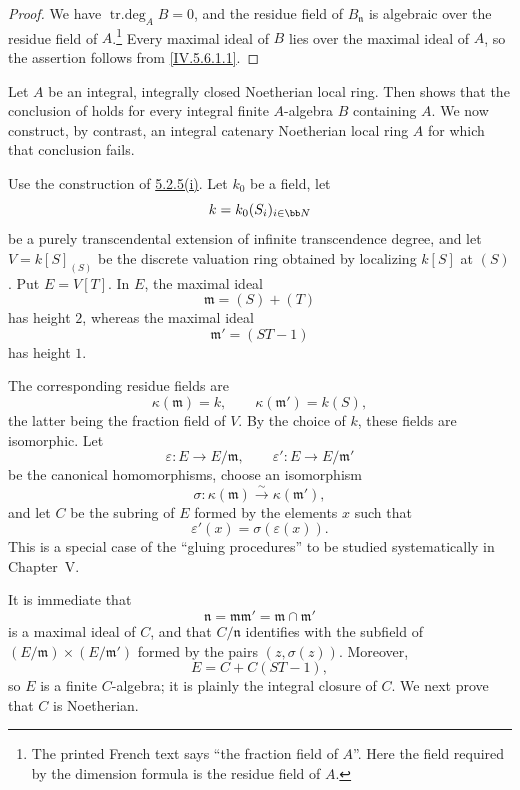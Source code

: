 \begin{proof}
We have $\operatorname{tr.deg}_A B=0$, and the residue field of
$B_{\mathfrak n}$ is algebraic over the residue field of
$A$.\footnote{The printed French text says ``the fraction field of
$A$''.  Here the field required by the dimension formula is the
residue field of $A$.}  Every maximal ideal of $B$ lies over the
maximal ideal of $A$, so the assertion follows from
\eqref{IV.5.6.1.1}.
\end{proof}

\begin{example}[5.6.11]
\label{IV.5.6.11}
Let $A$ be an integral, integrally closed Noetherian local ring.
Then  shows that the conclusion of
 holds for every integral finite $A$-algebra $B$
containing $A$.  We now construct, by contrast, an integral
catenary Noetherian local ring $A$ for which that conclusion fails.

Use the construction of {\hyperlink{ega4.c04.sec.5-2-5-i}{5.2.5\textup{(i)}}}.
Let $k_0$ be a field,
let
\[
k=k_0(S_i)_{i\in\bb N}
\]
be a purely transcendental extension of infinite transcendence
degree, and let $V=k[S]_{(S)}$ be the discrete valuation ring
obtained by localizing $k[S]$ at $(S)$.  Put $E=V[T]$.  In $E$, the
maximal ideal
\[
\mathfrak m=(S)+(T)
\]
has height $2$, whereas the maximal ideal
\[
\mathfrak m'=(ST-1)
\]
has height $1$.


The corresponding residue fields are
\[
\kappa(\mathfrak m)=k,
\qquad
\kappa(\mathfrak m')=k(S),
\]
the latter being the fraction field of $V$.  By the choice of $k$,
these fields are isomorphic.  Let
\[
\varepsilon:E\longrightarrow E/\mathfrak m,
\qquad
\varepsilon':E\longrightarrow E/\mathfrak m'
\]
be the canonical homomorphisms, choose an isomorphism
\[
\sigma:\kappa(\mathfrak m)\xrightarrow{\sim}\kappa(\mathfrak m'),
\]
and let $C$ be the subring of $E$ formed by the elements $x$ such
that
\[
\varepsilon'(x)=\sigma(\varepsilon(x)).
\]
This is a special case of the ``gluing procedures'' to be studied
systematically in Chapter~V.

It is immediate that
\[
\mathfrak n=\mathfrak m\mathfrak m'
 =\mathfrak m\cap\mathfrak m'
\]
is a maximal ideal of $C$, and that $C/\mathfrak n$ identifies with
the subfield of
$(E/\mathfrak m)\times(E/\mathfrak m')$ formed by the pairs
$(z,\sigma(z))$.  Moreover,
\[
E=C+C(ST-1),
\]
so $E$ is a finite $C$-algebra; it is plainly the integral closure
of $C$.  We next prove that $C$ is Noetherian.


\end{example}
